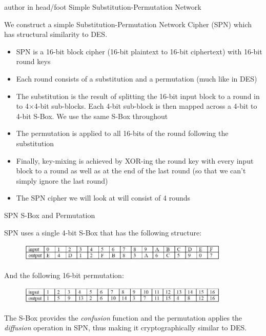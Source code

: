 \documentclass[9pt]{beamer}
\begin{document}
\begin{frame}
\begin{beamercolorbox}[ht=2.5ex,dp=1.125ex,center,rounded=true,shadow=true]{author in head/foot}
Simple Substitution-Permutation Network
\end{beamercolorbox}
\end{frame}

\begin{frame}
We construct a simple Substitution-Permutation Network Cipher (SPN) which has structural similarity to DES.

\begin{itemize}[<+->]
\item SPN is a 16-bit block cipher (16-bit plaintext to 16-bit ciphertext) with 16-bit round keys
\item Each round consists of a substitution and a permutation (much like in DES)
\item The substitution is the result of splitting the 16-bit input block to a round in to 4$\times$4-bit sub-blocks. Each 4-bit sub-block is then mapped across a 4-bit to 4-bit S-Box. We use the same S-Box throughout
\item The permutation is applied to all 16-bits of the round following the substitution
\item Finally, key-mixing is achieved by XOR-ing the round key with every input block to a round as well as at the end of the last round (so that we can't simply ignore the last round)
\item The SPN cipher we will look at will consist of 4 rounds
\end{itemize}
\end{frame}

\begin{frame}
SPN S-Box and Permutation

\vspace{5mm}
SPN uses a single 4-bit S-Box that has the following structure:
\begin{figure}
\includegraphics[width=0.9\textwidth]{spn_sbox.jpg}
\end{figure}

\vspace{5mm}
And the following 16-bit permutation:
\begin{figure}
\includegraphics[width=0.9\textwidth]{spn_perm.jpg}
\end{figure}

\vspace{5mm}
\pause The S-Box provides the {\it confusion} function and the permutation applies the {\it diffusion} operation in SPN, thus making it cryptographically similar to DES.
\vspace{5mm}

\end{frame}
\end{document}
